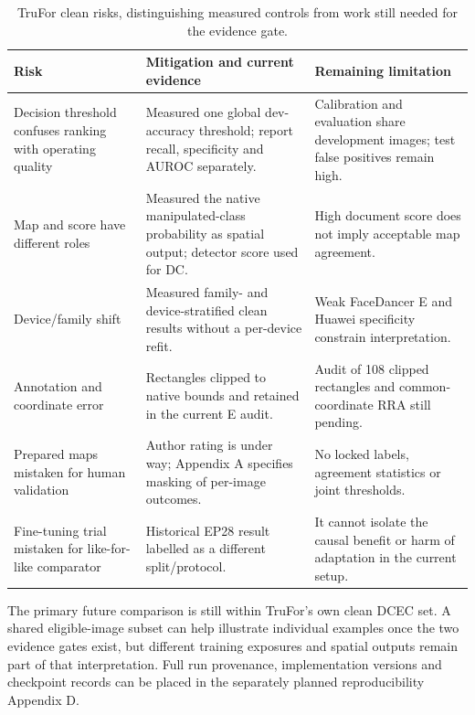 \begin{table}[htbp]
\centering\footnotesize
\caption{TruFor clean risks, distinguishing measured controls from work still needed for the evidence gate.}
\label{tab:app-trufor-risks}
\begin{tabularx}{\textwidth}{@{}>{\raggedright\arraybackslash}p{}>{\raggedright\arraybackslash}p{}>{\raggedright\arraybackslash}X@{}}
\toprule
Risk & Mitigation and current evidence & Remaining limitation \\
\midrule
Decision threshold confuses ranking with operating quality & Measured one global dev-accuracy threshold; report recall, specificity and AUROC separately. & Calibration and evaluation share development images; test false positives remain high. \\
Map and score have different roles & Measured the native manipulated-class probability as spatial output; detector score used for DC. & High document score does not imply acceptable map agreement. \\
Device/family shift & Measured family- and device-stratified clean results without a per-device refit. & Weak FaceDancer E and Huawei specificity constrain interpretation. \\
Annotation and coordinate error & Rectangles clipped to native bounds and retained in the current E audit. & Audit of 108 clipped rectangles and common-coordinate RRA still pending. \\
Prepared maps mistaken for human validation & Author rating is under way; Appendix A specifies masking of per-image outcomes. & No locked labels, agreement statistics or joint thresholds. \\
Fine-tuning trial mistaken for like-for-like comparator & Historical EP28 result labelled as a different split/protocol. & It cannot isolate the causal benefit or harm of adaptation in the current setup. \\
\bottomrule
\end{tabularx}
\end{table}

The primary future comparison is still within TruFor's own clean DCEC set. A shared eligible-image subset can help illustrate individual examples once the two evidence gates exist, but different training exposures and spatial outputs remain part of that interpretation. Full run provenance, implementation versions and checkpoint records can be placed in the separately planned reproducibility Appendix D.
